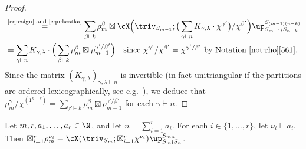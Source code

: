 \begin{proof}
\begin{align*}
		&\overset{\normalfont\tiny\text{\eqref{eqn:sign} and \eqref{eqn:kostka}}}{=} \sum_{\beta\vdash k} \rho^\beta_m \boxtimes \cX \Big( \triv_{S_{m-1}}; \big( \sum_{\gamma\vdash n} K_{\gamma,\lambda}\cdot \chi^{\gamma'} \big) /\chi^{\beta'} \Big) \up_{S_{m-1}\wr S_{n-k}}^{S_{(m-1)(n-k)}} \\
		&= \sum_{\gamma\vdash n} K_{\gamma,\lambda} \cdot \Big( \sum_{\beta\vdash k} \rho^\beta_m \boxtimes \rho^{\gamma'/\beta'}_{m-1} \Big)\quad\text{since $\chi^{\gamma'}/\chi^{\beta'}=\chi^{\gamma'/\beta'}$ by Notation~\ref{not:rho}\ref{561}}.
	\end{align*}
	Since the matrix $(K_{\gamma,\lambda})_{\gamma,\lambda\vdash n}$ is invertible (in fact unitriangular if the partitions are ordered lexicographically, see e.g.~\cite[Chapter 2]{JK}), we deduce that $\rho^\gamma_m/\chi^{(1^{n-k})} = \sum_{\beta\vdash k} \rho^\beta_m \boxtimes \rho^{\gamma'/\beta'}_{m-1}$ for each $\gamma\vdash n$.
\end{proof}

\begin{lemma}\label{lem:cX}
	Let $m,r,a_1,\dotsc,a_r\in\N$, and let $n=\sum_{i=1}^r a_i$. For each $i\in\{1,\dotsc,r\}$, let $\nu_i\vdash a_i$. Then $\boxtimes_{i=1}^r \rho_m^{\nu_i} = \cX(\triv_{S_m};\boxtimes_{i=1}^r \chi^{\nu_i} )\up_{S_m\wr S_n}^{S_{mn}}$.
\end{lemma}

